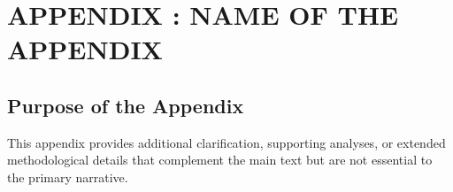 \chapter*{APPENDIX \thechapter: NAME OF THE APPENDIX}

\vspace{-22pt}

\section*{Purpose of the Appendix}

This appendix provides additional clarification, supporting analyses, or extended methodological details that complement the main text but are not essential to the primary narrative.

